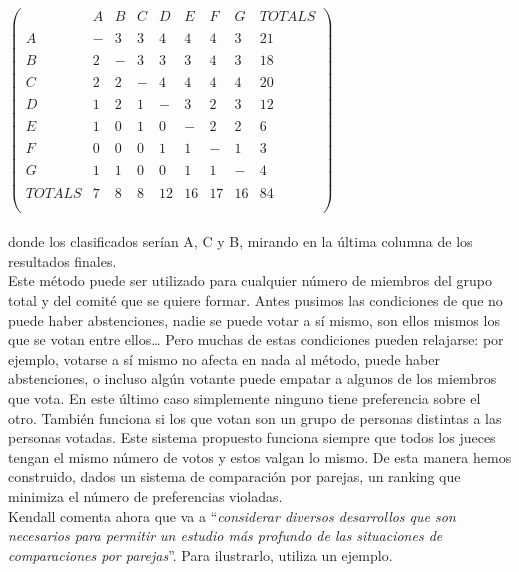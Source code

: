 \documentclass[a4paper]{article}
\begin{document}
\hspace{3cm}$\begin{pmatrix}
     & A & B & C & D & E & F & G & TOTALS\\ \\
   A & - & 3 & 3 & 4 & 4 & 4 & 3 & 21\\ \\
   B & 2 & - & 3 & 3 & 3 & 4 & 3 & 18\\\\
   C & 2 & 2 & - & 4 & 4 & 4 & 4 & 20\\\\
   D & 1 & 2 & 1 & - & 3 & 2 & 3 & 12\\\\
   E & 1 & 0 & 1 & 0 & - & 2 & 2 & 6\\\\
   F & 0 & 0 & 0 & 1 & 1 & - & 1 & 3\\\\
   G & 1 & 1 & 0 & 0 & 1 & 1 & - & 4\\\\
   TOTALS  & 7 & 8 & 8 & 12 & 16 & 17 & 16 & 84\\\\
\end{pmatrix}$\\
	\\
	
donde los clasificados serían A, C y B, mirando en la última columna de los resultados finales.\\


	Este método puede ser utilizado para cualquier número de miembros del grupo total y del comité que se quiere formar. Antes pusimos las condiciones de que no puede haber abstenciones, nadie se puede votar a sí mismo, son ellos mismos los que se votan entre ellos… Pero muchas de estas condiciones pueden relajarse: por ejemplo, votarse a sí mismo no afecta en nada al método, puede haber abstenciones, o incluso algún votante puede empatar a algunos de los miembros que vota. En este último caso simplemente ninguno tiene preferencia sobre el otro. También funciona si los que votan son un grupo de personas distintas a las personas votadas. Este sistema propuesto funciona siempre que todos los jueces tengan el mismo número de votos y estos valgan lo mismo. De esta manera hemos construido, dados un sistema de comparación por parejas, un ranking que minimiza el número de preferencias violadas.\\
	

	Kendall comenta ahora que va a “\textit{considerar diversos desarrollos que son necesarios para permitir un estudio más profundo de las situaciones de comparaciones por parejas}”. Para ilustrarlo, utiliza un ejemplo.\\
	
\end{document}
